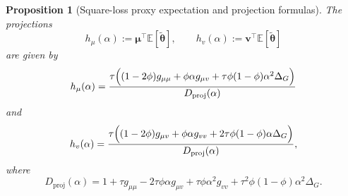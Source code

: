 \documentclass[11pt]{article}
\newcommand{\EE}{\mathbb{E}}
\newcommand{\bv}{\mathbf{v}}
\newcommand{\bmu}{\boldsymbol{\mu}}
\newcommand{\btheta}{\boldsymbol{\theta}}
\newtheorem{proposition}[theorem]{Proposition}
\begin{document}
\begin{proposition}[Square-loss proxy expectation and projection formulas]
The projections
\[
h_\mu(\alpha):=\bmu^\top\EE[\tilde{\btheta}],
\qquad
h_v(\alpha):=\bv^\top\EE[\tilde{\btheta}]
\]
are given by
\begin{equation}
\label{eq:lin_hmu_exact}
h_\mu(\alpha)
=
\frac{
\tau\Bigl((1-2\phi)g_{\mu\mu}
+\phi\alpha g_{\mu v}
+\tau\phi(1-\phi)\alpha^2\Delta_G\Bigr)
}
{D_{\mathrm{proj}}(\alpha)}
\end{equation}
and
\begin{equation}
\label{eq:lin_hv_exact}
h_v(\alpha)
=
\frac{
\tau\Bigl((1-2\phi)g_{\mu v}
+\phi\alpha g_{vv}
+2\tau\phi(1-\phi)\alpha\Delta_G\Bigr)
}
{D_{\mathrm{proj}}(\alpha)},
\end{equation}
where
\begin{equation}
\label{eq:lin_Dh}
D_{\mathrm{proj}}(\alpha)
=
1+\tau g_{\mu\mu}
-2\tau\phi\alpha g_{\mu v}
+\tau\phi\alpha^2 g_{vv}
+\tau^2\phi(1-\phi)\alpha^2\Delta_G .
\end{equation}
\end{proposition}
\end{document}
